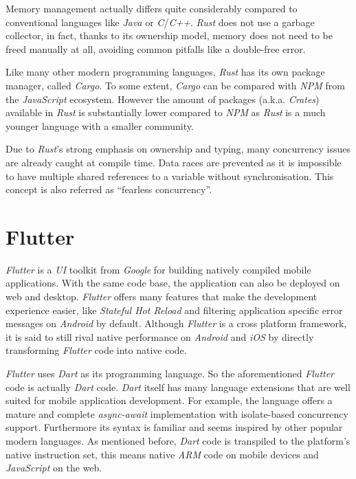 Memory management actually differs quite considerably compared to conventional languages like
\textit{Java} or \textit{C}/\textit{C++}. \textit{Rust} does not use a garbage collector, in fact,
thanks to its ownership model, memory does not need to be freed manually at all, avoiding common
pitfalls like a double-free error.

Like many other modern programming languages, \textit{Rust} has its own package manager, called
\textit{Cargo}. To some extent, \textit{Cargo} can be compared with \textit{NPM} from the
\textit{JavaScript} ecosystem. However the amount of packages (a.k.a. \textit{Crates}) available in
\textit{Rust} is substantially lower compared to \textit{NPM} as \textit{Rust} is a much younger
language with a smaller community.

Due to \textit{Rust}'s strong emphasis on ownership and typing, many concurrency issues are already
caught at compile time. Data races are prevented as it is impossible to have multiple shared
references to a variable without synchronisation. This concept is also referred as “fearless
concurrency”. \cite{rustbook2}

\section{Flutter}

\textit{Flutter} is a \textit{UI} toolkit from \textit{Google} for building natively compiled mobile
applications. With the same code base, the application can also be deployed on web and desktop.
\textit{Flutter} offers many features that make the development experience easier, like
\textit{Stateful Hot Reload} and filtering application specific error messages on \textit{Android}
by default. Although \textit{Flutter} is a cross platform framework, it is said to still rival
native performance on \textit{Android} and \textit{iOS} by directly transforming \textit{Flutter}
code into native code.
\cite{flutter}

\textit{Flutter} uses \textit{Dart} as its programming language. So the aforementioned \textit{Flutter}
code is actually \textit{Dart} code. \textit{Dart} itself has many language extensions that are well
suited for mobile application development. For example, the language offers a mature and complete
\textit{async-await} implementation with isolate-based concurrency support. Furthermore its syntax
is familiar and seems inspired by other popular modern languages. As mentioned before, \textit{Dart}
code is transpiled to the platform's native instruction set, this means native \textit{ARM} code on
mobile devices and \textit{JavaScript} on the web. \cite{dart}

